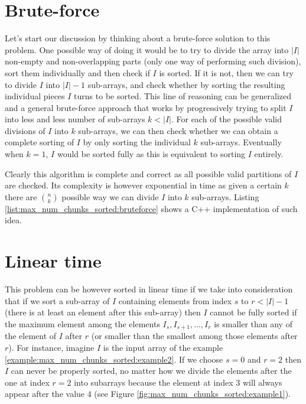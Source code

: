 \section{Brute-force}
\label{max_num_chunks_sorted:sec:bruteforce}


Let's start our discussion by thinking about a brute-force solution to this problem. 
One possible way of doing it would be to try to divide the array into $|I|$ non-empty and non-overlapping parts (only one way of performing such division), 
sort  them individually and then check if $I$ is sorted. 
If it is not, then we can try to divide $I$ into $|I|-1$ sub-arrays,
and check whether by sorting the resulting individual pieces $I$ turns to be sorted.
This line of reasoning can be generalized and a general brute-force approach
that works by progressively trying to split $I$ into less and less number of sub-arrays $k <|I|$.
For each of the possible valid divisions of $I$ into $k$ sub-arrays, we can then check whether we can obtain a complete sorting of $I$ by only sorting the individual $k$ sub-arrays.
Eventually when $k=1$, $I$ would be sorted fully as this is equivalent to sorting $I$ entirely.

Clearly this algorithm is complete and correct
as all possible valid partitions of $I$ are checked. Its complexity is however exponential
in time as given a certain $k$ there are ${n \choose k} $ possible way we can divide $I$ into $k$ sub-arrays. 
Listing \ref{list:max_num_chunks_sorted:bruteforce} shows a C++ implementation of such idea. 


\begin{minipage}{\linewidth}
    
\end{minipage}


\section{Linear time}
\label{max_num_chunks_sorted:sec:lineartime}
This problem can be however sorted in linear time if we take into consideration that if we sort a sub-array of $I$
containing elements from index $s$ to $r< |I|-1$  (there is at least an element after this sub-array) 
then $I$ cannot be fully sorted if the maximum element among the elements $I_s, I_{s+1},\ldots, I_r$
is smaller than any of the element of $I$ after $r$ (or smaller than the smallest among those elements after $r$). 
For instance, imagine $I$ is the input array of the example \ref{example:max_num_chunks_sorted:example2}. 
If we choose $s=0$ and $r=2$ then $I$ can never be properly sorted, no matter how we divide the elements after the one at index $r=2$ into subarrays
because the element at index $3$ will always appear after the value $4$ (see Figure \ref{fig:max_num_chunks_sorted:example1}).

